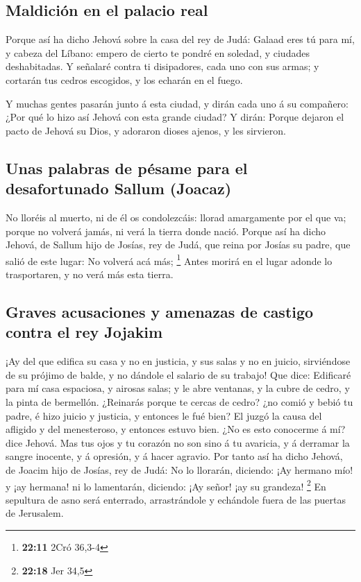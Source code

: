 \hypertarget{maldiciuxf3n-en-el-palacio-real}{%
\subsection{Maldición en el palacio
real}\label{maldiciuxf3n-en-el-palacio-real}}

 Porque así ha dicho Jehová sobre la casa del rey de Judá:
Galaad eres tú para mí, y cabeza del Líbano: empero de cierto te pondré
en soledad, y ciudades deshabitadas.  Y señalaré contra ti
disipadores, cada uno con sus armas; y cortarán tus cedros escogidos, y
los echarán en el fuego.

 Y muchas gentes pasarán junto á esta ciudad, y dirán cada
uno á su compañero: ¿Por qué lo hizo así Jehová con esta grande ciudad?
 Y dirán: Porque dejaron el pacto de Jehová su Dios, y
adoraron dioses ajenos, y les sirvieron.

\hypertarget{unas-palabras-de-puxe9same-para-el-desafortunado-sallum-joacaz}{%
\subsection{Unas palabras de pésame para el desafortunado Sallum
(Joacaz)}\label{unas-palabras-de-puxe9same-para-el-desafortunado-sallum-joacaz}}

 No lloréis al muerto, ni de él os condolezcáis: llorad
amargamente por el que va; porque no volverá jamás, ni verá la tierra
donde nació.  Porque así ha dicho Jehová, de Sallum hijo de
Josías, rey de Judá, que reina por Josías su padre, que salió de este
lugar: No volverá acá más; \footnote{\textbf{22:11} 2Cró 36,3-4}
 Antes morirá en el lugar adonde lo trasportaren, y no verá
más esta tierra.

\hypertarget{graves-acusaciones-y-amenazas-de-castigo-contra-el-rey-jojakim}{%
\subsection{Graves acusaciones y amenazas de castigo contra el rey
Jojakim}\label{graves-acusaciones-y-amenazas-de-castigo-contra-el-rey-jojakim}}

 ¡Ay del que edifica su casa y no en justicia, y sus salas
y no en juicio, sirviéndose de su prójimo de balde, y no dándole el
salario de su trabajo!  Que dice: Edificaré para mí casa
espaciosa, y airosas salas; y le abre ventanas, y la cubre de cedro, y
la pinta de bermellón.  ¿Reinarás porque te cercas de
cedro? ¿no comió y bebió tu padre, é hizo juicio y justicia, y entonces
le fué bien?  El juzgó la causa del afligido y del
menesteroso, y entonces estuvo bien. ¿No es esto conocerme á mí? dice
Jehová.  Mas tus ojos y tu corazón no son sino á tu
avaricia, y á derramar la sangre inocente, y á opresión, y á hacer
agravio.  Por tanto así ha dicho Jehová, de Joacim hijo de
Josías, rey de Judá: No lo llorarán, diciendo: ¡Ay hermano mío! y ¡ay
hermana! ni lo lamentarán, diciendo: ¡Ay señor! ¡ay su grandeza!
\footnote{\textbf{22:18} Jer 34,5}  En sepultura de asno
será enterrado, arrastrándole y echándole fuera de las puertas de
Jerusalem.

